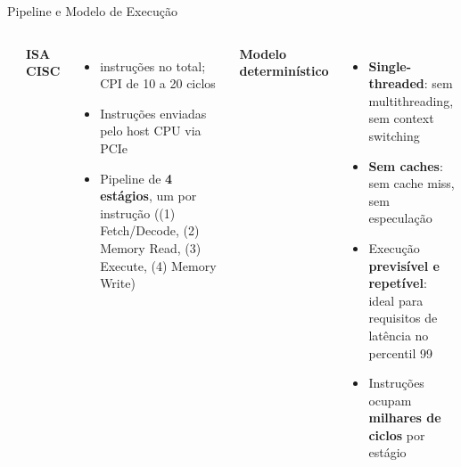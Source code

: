 \documentclass[aspectratio=169]{beamer}
\begin{document}
\begin{frame}{Pipeline e Modelo de Execução}
  \begin{columns}
 \\[0.5cm]
    \vfill
    
      \textbf{ISA CISC}
      \begin{itemize}
        \item{ instruções no total; CPI de 10 a 20 ciclos}
        \item{\justify  Instruções enviadas pelo host CPU via PCIe}
        \item{\justify Pipeline de \textbf{4 estágios}, um por instrução ((1) Fetch/Decode, (2) Memory Read, (3) Execute, (4) Memory Write)}
        
      \end{itemize}
     
      \textbf{Modelo determinístico}
      \\[0.5cm]
      \begin{itemize}
      
        \item{\justify \textbf{Single-threaded}: sem multithreading, sem context switching}\\[.5cm]
        \item{\justify \textbf{Sem caches}: sem cache miss, sem especulação}\\[.5cm]
        \item{\justify Execução \textbf{previsível e repetível}: ideal para requisitos de latência no percentil 99}\\[.5cm]
        \item{\justify Instruções ocupam \textbf{milhares de ciclos} por estágio}
      \end{itemize}
      \vfill
  \end{columns}
\end{frame}

\end{document}
